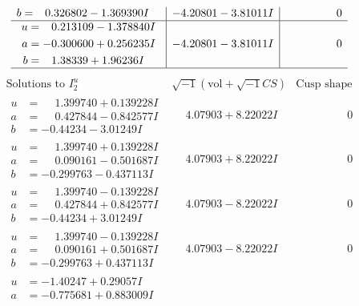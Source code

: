 \documentclass[1p]{elsarticle_modified}
\theoremstyle{definition}
\newcommand{\I}{\sqrt{-1}}
\begin{document}
$$\begin{array}{c|c|c}
\begin{aligned}
b &= \phantom{-}0.326802 - 1.369390 I\end{aligned}
 & -4.20801 - 3.81011 I & \phantom{-0.000000 } 0 \\ \hline\begin{aligned}
u &= \phantom{-}0.213109 - 1.378840 I \\
a &= -0.300600 + 0.256235 I \\
b &= \phantom{-}1.38339 + 1.96236 I\end{aligned}
 & -4.20801 - 3.81011 I & \phantom{-0.000000 } 0\\
 \hline 
 \end{array}$$\newpage$$\begin{array}{c|c|c}  
\text{Solutions to }I^u_{2}& \I (\text{vol} + \sqrt{-1}CS) & \text{Cusp shape}\\
 \hline 
\begin{aligned}
u &= \phantom{-}1.399740 + 0.139228 I \\
a &= \phantom{-}0.427844 - 0.842577 I \\
b &= -0.44234 - 3.01249 I\end{aligned}
 & \phantom{-}4.07903 + 8.22022 I & \phantom{-0.000000 } 0 \\ \hline\begin{aligned}
u &= \phantom{-}1.399740 + 0.139228 I \\
a &= \phantom{-}0.090161 - 0.501687 I \\
b &= -0.299763 - 0.437113 I\end{aligned}
 & \phantom{-}4.07903 + 8.22022 I & \phantom{-0.000000 } 0 \\ \hline\begin{aligned}
u &= \phantom{-}1.399740 - 0.139228 I \\
a &= \phantom{-}0.427844 + 0.842577 I \\
b &= -0.44234 + 3.01249 I\end{aligned}
 & \phantom{-}4.07903 - 8.22022 I & \phantom{-0.000000 } 0 \\ \hline\begin{aligned}
u &= \phantom{-}1.399740 - 0.139228 I \\
a &= \phantom{-}0.090161 + 0.501687 I \\
b &= -0.299763 + 0.437113 I\end{aligned}
 & \phantom{-}4.07903 - 8.22022 I & \phantom{-0.000000 } 0 \\ \hline\begin{aligned}
u &= -1.40247 + 0.29057 I \\
a &= -0.775681 + 0.883009 I \\

\end{aligned}
\end{array}$$
\end{document}
